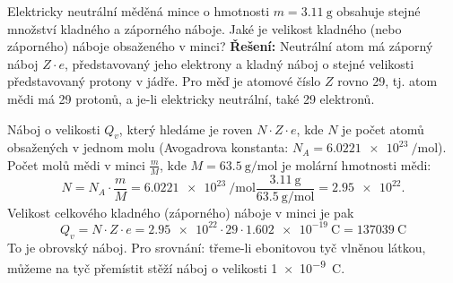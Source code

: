 \begin{example}
  Elektricky neutrální měděná mince o hmotnosti \(m = \SI{3.11}{\g}\) obsahuje stejné množství 
  kladného a záporného náboje. Jaké je velikost kladného (nebo záporného) náboje obsaženého v 
  minci?\newline  
  \textbf{Řešení:}\newline
  Neutrální atom má záporný náboj \(Z\cdot e\), představovaný jeho elektrony a kladný náboj o 
  stejné velikosti představovaný protony v jádře. Pro měď je atomové číslo \(Z\) rovno \num{29}, 
  tj. atom mědi má \num{29} protonů, a je-li elektricky neutrální, také \num{29} elektronů.
  
  Náboj o velikosti \(Q_v\), který hledáme je roven \(N\cdot Z\cdot e\), kde \(N\) je počet atomů 
  obsažených v  jednom molu (Avogadrova konstanta: \(N_A = \SI{6.0221e23}{\per\mole}\)). Počet 
  molů mědi v minci \(\frac{m}{M}\), kde \(M = \SI{63.5}{\g\per\mole}\) je molární hmotnosti mědi: 
  \begin{equation*}
    N = N_A\cdot\frac{m}{M} = \SI{6.0221e23}{\per\mole}
           \frac{\SI{3.11}{\g}}{\SI{63.5}{\g\per\mole}} 
      = \num{2.95e22}.
  \end{equation*}
 Velikost celkového kladného (záporného) náboje v minci je pak 
  \begin{equation*}
    Q_v = N\cdot Z\cdot e = \num{2.95e22}\cdot\num{29}\cdot\SI{1.602e-19}{\coulomb} 
        = \SI{137039}{\coulomb}
  \end{equation*}
  To je obrovský náboj. Pro srovnání: třeme-li ebonitovou tyč vlněnou látkou, můžeme na tyč 
  přemístit stěží náboj o velikosti \SI{1e-9}{\coulomb}.
\end{example} 
